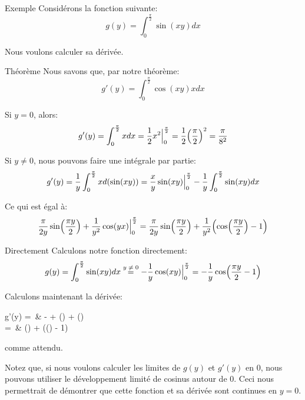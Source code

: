 \documentclass[a4paper]{article}
\begin{document}
\begin{parag}{Exemple}
    Considérons la fonction suivante:
    \[g\left(y\right) = \int_{0}^{\frac{\pi}{2}} \sin\left(xy\right)dx\]

    Nous voulons calculer sa dérivée.

    \begin{subparag}{Théorème}
        Nous savons que, par notre théorème:
        \[g'\left(y\right) = \int_{0}^{\frac{\pi}{2}} \cos\left(xy\right)x dx\]

        Si $y = 0$, alors:
        \[g'\left(y\right) = \int_{0}^{\frac{\pi}{2}} x dx = \frac{1}{2}x^2 \eval_{0}^{\frac{\pi}{2}} = \frac{1}{2}\left(\frac{\pi}{2}\right)^2 = \frac{\pi}{8^2}\]

        Si $y \neq 0$, nous pouvons faire une intégrale par partie:
        \[g'\left(y\right) = \frac{1}{y} \int_{0}^{\frac{\pi}{2}} x d\left(\sin\left(xy\right)\right) = \frac{x}{y}\sin\left(xy\right)\eval_{0}^{\frac{\pi}{2}} - \frac{1}{y} \int_{0}^{\frac{\pi}{2}} \sin\left(xy\right)dx\]

        Ce qui est égal à:
        \[\frac{\pi}{2y}\sin\left(\frac{\pi y}{2}\right) + \frac{1}{y^2}\cos\left(yx\right)\eval_{0}^{\frac{\pi}{2}} = \frac{\pi}{2y} \sin\left(\frac{\pi y}{2}\right) + \frac{1}{y^2}\left(\cos\left(\frac{\pi y}{2}\right) - 1\right)\]

    \end{subparag}

    \begin{subparag}{Directement}
        Calculons notre fonction directement:
        \[g\left(y\right) = \int_{0}^{\frac{\pi}{2}} \sin\left(xy\right)dx \over{=}{$y \neq 0$} -\frac{1}{y}\cos\left(xy\right)\eval_{0}^{\frac{\pi}{2}} = -\frac{1}{y}\cos\left(\frac{\pi y}{2} - 1\right)\]

        Calculons maintenant la dérivée:
        \begin{multiequality}
        g'\left(y\right) =\ & - + \cos\left(\right) +  \sin\left(\right) \cdot {}  \\
        =\ & \sin\left(\right) + \left(\cos\left(\right) - 1\right) 
        \end{multiequality}
        comme attendu.

        Notez que, si nous voulons calculer les limites de $g\left(y\right)$ et $g'\left(y\right)$ en 0, nous pouvons utiliser le développement limité de cosinus autour de 0. Ceci nous permettrait de démontrer que cette fonction et sa dérivée sont continues en $y = 0$.
    \end{subparag}
\end{parag}
\end{document}
